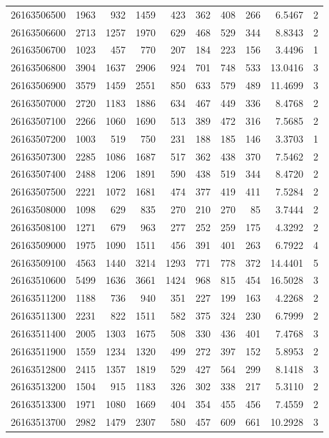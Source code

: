 \documentclass[11pt,landscape]{article}
\begin{document}
{\begin{longtable}[]{@{}lrrrrrrrrr@{}}
26163506500 & 1963 & 932 & 1459 & 423 & 362 & 408 & 266 & 6.5467 & 2 \\
26163506600 & 2713 & 1257 & 1970 & 629 & 468 & 529 & 344 & 8.8343 & 2 \\
26163506700 & 1023 & 457 & 770 & 207 & 184 & 223 & 156 & 3.4496 & 1 \\
26163506800 & 3904 & 1637 & 2906 & 924 & 701 & 748 & 533 & 13.0416 & 3 \\
26163506900 & 3579 & 1459 & 2551 & 850 & 633 & 579 & 489 & 11.4699 & 3 \\
26163507000 & 2720 & 1183 & 1886 & 634 & 467 & 449 & 336 & 8.4768 & 2 \\
26163507100 & 2266 & 1060 & 1690 & 513 & 389 & 472 & 316 & 7.5685 & 2 \\
26163507200 & 1003 & 519 & 750 & 231 & 188 & 185 & 146 & 3.3703 & 1 \\
26163507300 & 2285 & 1086 & 1687 & 517 & 362 & 438 & 370 & 7.5462 & 2 \\
26163507400 & 2488 & 1206 & 1891 & 590 & 438 & 519 & 344 & 8.4720 & 2 \\
26163507500 & 2221 & 1072 & 1681 & 474 & 377 & 419 & 411 & 7.5284 & 2 \\
26163508000 & 1098 & 629 & 835 & 270 & 210 & 270 & 85 & 3.7444 & 2 \\
26163508100 & 1271 & 679 & 963 & 277 & 252 & 259 & 175 & 4.3292 & 2 \\
26163509000 & 1975 & 1090 & 1511 & 456 & 391 & 401 & 263 & 6.7922 & 4 \\
26163509100 & 4563 & 1440 & 3214 & 1293 & 771 & 778 & 372 & 14.4401 & 5 \\
26163510600 & 5499 & 1636 & 3661 & 1424 & 968 & 815 & 454 & 16.5028 & 3 \\
26163511200 & 1188 & 736 & 940 & 351 & 227 & 199 & 163 & 4.2268 & 2 \\
26163511300 & 2231 & 822 & 1511 & 582 & 375 & 324 & 230 & 6.7999 & 2 \\
26163511400 & 2005 & 1303 & 1675 & 508 & 330 & 436 & 401 & 7.4768 & 3 \\
26163511900 & 1559 & 1234 & 1320 & 499 & 272 & 397 & 152 & 5.8953 & 2 \\
26163512800 & 2415 & 1357 & 1819 & 529 & 427 & 564 & 299 & 8.1418 & 3 \\
26163513200 & 1504 & 915 & 1183 & 326 & 302 & 338 & 217 & 5.3110 & 2 \\
26163513300 & 1971 & 1080 & 1669 & 404 & 354 & 455 & 456 & 7.4559 & 2 \\
26163513700 & 2982 & 1479 & 2307 & 580 & 457 & 609 & 661 & 10.2928 & 3 \\

\end{longtable}}
\end{document}
